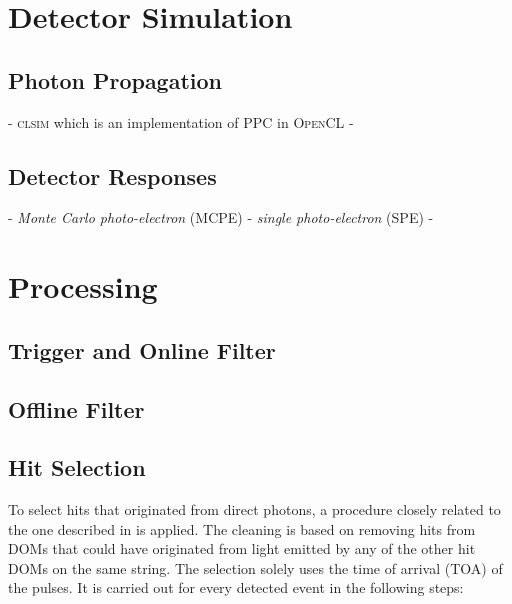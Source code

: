 \section{Detector Simulation}

\subsection{Photon Propagation}


- \textsc{clsim}  which is an implementation of \textsc{PPC} in \textsc{OpenCL}
- 

\subsection{Detector Responses}

- \textit{Monte Carlo photo-electron} (MCPE)
- \textit{single photo-electron} (SPE)
- 

\section{Processing}

\subsection{Trigger and Online Filter}

\subsection{Offline Filter} 


\subsection{Hit Selection} 

To select hits that originated from direct photons, a procedure closely related to the one described in  is applied.
The cleaning is based on removing hits from DOMs that could have originated from light emitted by any of the other hit DOMs on the same string.
The selection solely uses the time of arrival (TOA) of the pulses. It is carried out for every detected event in the following steps:

